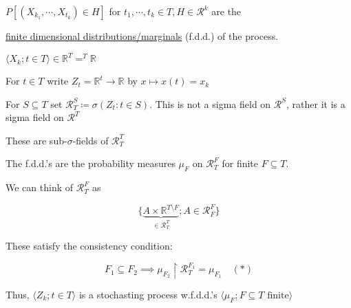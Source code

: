 \documentclass{article}
\theoremstyle{definition}
\begin{document}
\(P[(X_{k_1},\cdots,X_{t_k})\in H]\) for \(t_1,\cdots,t_k\in T, H\in \mathcal{R}^k\) are the 

\underline{finite dimensional distributions/marginals} (f.d.d.) of the process.

\(\langle X_k; t\in T \rangle \in \mathbb{R}^T = ^T\mathbb{R} \) 


For \(t\in T\) write \(Z_t=\mathbb{R}^t \to \mathbb{R}\) by \(x \mapsto x(t)=x_k\)  

For \(S \subseteq T\) set \(\mathcal{R}^S_T \coloneqq \sigma(Z_t:t\in S)\). This is not a sigma field on \(\mathcal{R}^S\), rather it is a sigma field on \(\mathcal{R}^T\)  

These are sub-\(\sigma\)-fields of \(\mathcal{R}^T_T\)

The f.d.d.'s are the probability measures \(\mu_F\) on \(\mathcal{R} ^F_T\) for finite \(F \subseteq T\).

We can think of \(\mathcal{R}^F_T\) as

\[
    \{ \underbrace{A\times\mathbb{R}^{T\setminus F}}_{\in \mathcal{R}^T_T};A\in \mathcal{R}^F_F \} 
\]

These satisfy the consistency condition:

\[
    F_1 \subseteq F_2 \implies \mu_{F_2}\upharpoonright \mathcal{R}_T^{F_1} = \mu_{F_1} \quad (\ast)
\]

Thus, \(\langle Z_k; t\in T \rangle \) is a stochasting process w.f.d.d.'s \(\langle \mu_F ; F \subseteq T \text{ finite}  \rangle \)  
\end{document}
